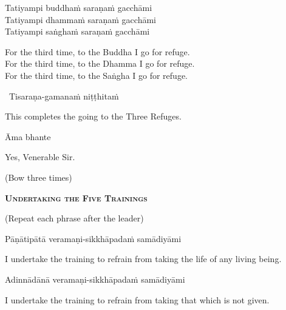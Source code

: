 Tatiyampi buddhaṁ saraṇaṁ gacchāmi\\
Tatiyampi dhammaṁ saraṇaṁ gacchāmi\\
Tatiyampi saṅghaṁ saraṇaṁ gacchāmi

\begin{english-verses}
  For the third time, to the Buddha I go for refuge.\\
  For the third time, to the Dhamma I go for refuge.\\
  For the third time, to the Saṅgha I go for refuge.
\end{english-verses}

\anglebracketleft\ \hspace{-0.5mm}Tisaraṇa-gamanaṁ niṭṭhitaṁ \hspace{-0.5mm}\anglebracketright\

\begin{english}
  This completes the going to the Three Refuges.
\end{english}

Āma bhante

\begin{english}
  Yes, Venerable Sir.
\end{english}

(Bow three times)

\clearpage

\begin{center}
  \textbf{\textsc{Undertaking the Five Trainings}}
\end{center}

\begin{center}
  (Repeat each phrase after the leader)
\end{center}

Pāṇātipātā veramaṇi-sikkhāpadaṁ samādiyāmi

\begin{english-hang}
  I undertake the training\hyperlink{endnote139-appendix}{\hypertarget{endnote139-body}{}}
  to refrain from taking the life of any living being.
\end{english-hang}

Adinnādānā veramaṇi-sikkhāpadaṁ samādiyāmi

\begin{english}
  I undertake the training to refrain from taking that which is not given.
\end{english}

